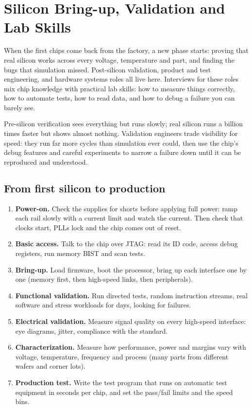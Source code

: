 \chapter{Silicon Bring-up, Validation and Lab Skills}
\label{ch:psv}

When the first chips come back from the factory, a new phase starts: proving that real silicon works across every voltage, temperature and part, and finding the bugs that simulation missed. Post-silicon validation, product and test engineering, and hardware systems roles all live here. Interviews for these roles mix chip knowledge with practical lab skills: how to measure things correctly, how to automate tests, how to read data, and how to debug a failure you can barely see.

\begin{bigidea}
Pre-silicon verification sees everything but runs slowly; real silicon runs a billion times faster but shows almost nothing. Validation engineers trade visibility for speed: they run far more cycles than simulation ever could, then use the chip's debug features and careful experiments to narrow a failure down until it can be reproduced and understood.
\end{bigidea}

\section{From first silicon to production}

\begin{enumerate}
  \item \textbf{Power-on.} Check the supplies for shorts before applying full power: ramp each rail slowly with a current limit and watch the current. Then check that clocks start, PLLs lock and the chip comes out of reset.
  \item \textbf{Basic access.} Talk to the chip over JTAG: read its ID code, access debug registers, run memory BIST and scan tests.
  \item \textbf{Bring-up.} Load firmware, boot the processor, bring up each interface one by one (memory first, then high-speed links, then peripherals).
  \item \textbf{Functional validation.} Run directed tests, random instruction streams, real software and stress workloads for days, looking for failures.
  \item \textbf{Electrical validation.} Measure signal quality on every high-speed interface: eye diagrams, jitter, compliance with the standard.
  \item \textbf{Characterization.} Measure how performance, power and margins vary with voltage, temperature, frequency and process (many parts from different wafers and corner lots).
  \item \textbf{Production test.} Write the test program that runs on automatic test equipment in seconds per chip, and set the pass/fail limits and the speed bins.
\end{enumerate}

